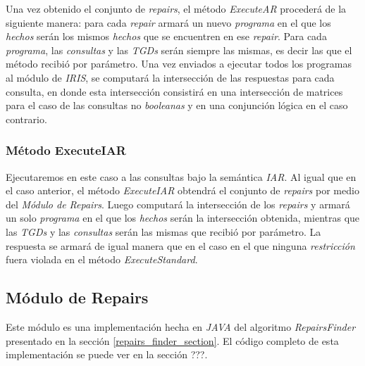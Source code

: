 \documentclass[11pt,a4paper,twoside]{tesis}
\begin{document}
Una vez obtenido el conjunto de \textit{repairs}, el método \textit{ExecuteAR} procederá de la siguiente manera: para cada \textit{repair} armará un nuevo \textit{programa} en el que los \textit{hechos} serán los mismos \textit{hechos} que se encuentren en ese \textit{repair}. Para cada \textit{programa}, las \textit{consultas} y las \textit{TGDs} serán siempre las mismas, es decir las que el método recibió por parámetro. Una vez enviados a ejecutar todos los programas al módulo de \textit{IRIS}, se computará la intersección de las respuestas para cada consulta, en donde esta intersección consistirá en una intersección de matrices para el caso de las consultas no \textit{booleanas} y en una conjunción lógica en el caso contrario.

\subsubsection{Método ExecuteIAR}

Ejecutaremos en este caso a las consultas bajo la semántica \textit{IAR}. Al igual que en el caso anterior, el método \textit{ExecuteIAR} obtendrá el conjunto de \textit{repairs} por medio del \textit{Módulo de Repairs}. Luego computará la intersección de los \textit{repairs} y armará un solo \textit{programa} en el que los \textit{hechos} serán la intersección obtenida, mientras que las \textit{TGDs} y las \textit{consultas} serán las mismas que recibió por parámetro. La respuesta se armará de igual manera que en el caso en el que ninguna \textit{restricción} fuera violada en el método  \textit{ExecuteStandard}.

\subsection{Módulo de Repairs}\label{modulo_de_repairs}

Este módulo es una implementación hecha en \textit{JAVA} del algoritmo \textit{RepairsFinder} presentado en la sección \ref{repairs_finder_section}. El código completo de esta implementación se puede ver en la sección ???. 
\end{document}
